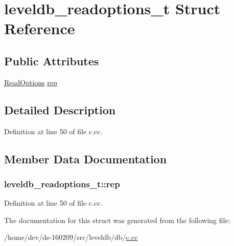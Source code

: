 \hypertarget{structleveldb__readoptions__t}{}\section{leveldb\+\_\+readoptions\+\_\+t Struct Reference}
\label{structleveldb__readoptions__t}
\subsection*{Public Attributes}
\begin{DoxyCompactItemize}
\item 
\hyperlink{structleveldb_1_1_read_options}{Read\+Options} \hyperlink{structleveldb__readoptions__t_ad4bc0f881cf2c7a859642cd878dd568c}{rep}
\end{DoxyCompactItemize}


\subsection{Detailed Description}


Definition at line 50 of file c.\+cc.



\subsection{Member Data Documentation}
\hypertarget{structleveldb__readoptions__t_ad4bc0f881cf2c7a859642cd878dd568c}{}
\subsubsection[{rep}]{ leveldb\+\_\+readoptions\+\_\+t\+::rep}\label{structleveldb__readoptions__t_ad4bc0f881cf2c7a859642cd878dd568c}


Definition at line 50 of file c.\+cc.



The documentation for this struct was generated from the following file\+:\begin{DoxyCompactItemize}
\item 
/home/dev/ds-\/160209/src/leveldb/db/\hyperlink{c_8cc}{c.\+cc}\end{DoxyCompactItemize}
